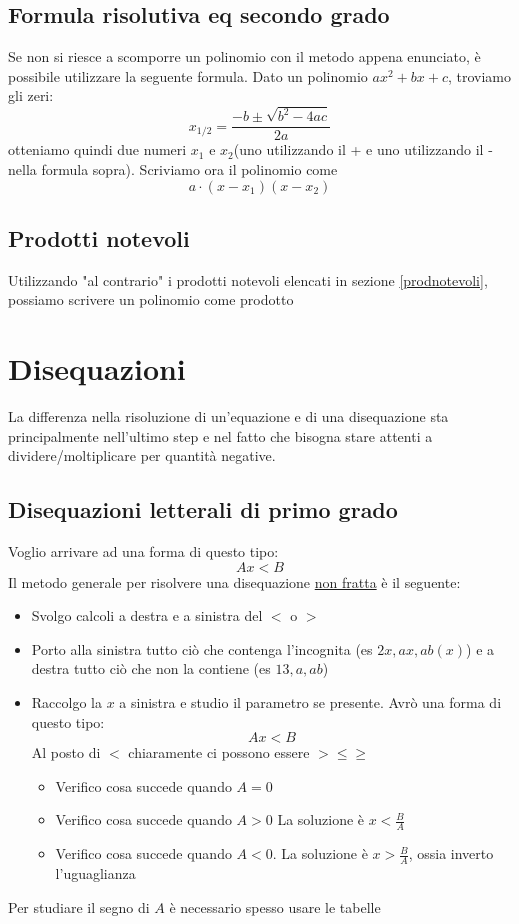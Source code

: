 \subsection{Formula risolutiva eq secondo grado}
Se non si riesce a scomporre un polinomio con il metodo appena enunciato, è possibile utilizzare la seguente formula. Dato un polinomio $ ax^2  + bx + c $, troviamo gli zeri:
\[
	x_{1 / 2} = \frac{-b \pm \sqrt{b^2 - 4ac}}{2a}
\]
otteniamo quindi due numeri $ x_1 $ e $ x_2 $(uno utilizzando il + e uno utilizzando il - nella formula sopra). Scriviamo ora il polinomio come
\[
	a\cdot \left(x-x_1\right)\left(x-x_2\right)
\]

\subsection{Prodotti notevoli}
Utilizzando "al contrario" i prodotti notevoli elencati in sezione \ref{prodnotevoli}, possiamo scrivere un polinomio come prodotto
\section{Disequazioni}
La differenza nella risoluzione di un'equazione e di una disequazione sta principalmente nell'ultimo step e nel fatto che bisogna stare attenti a dividere/moltiplicare per quantità negative.

\subsection{Disequazioni letterali di primo grado}
Voglio arrivare ad una forma di questo tipo:
\[
	Ax < B
\]
Il metodo generale per risolvere una disequazione \underline{non fratta} è il seguente:
\begin{itemize}
	\item Svolgo calcoli a destra e a sinistra del $ < $ o $ > $
	\item Porto alla sinistra tutto ciò che contenga l'incognita (es $ 2x, ax, ab\left(x\right) $) e a destra tutto ciò che non la contiene (es $ 13, a, ab $)
	\item Raccolgo la $ x $ a sinistra e studio il parametro se presente. Avrò una forma di questo tipo:
	      \[
		      Ax < B
	      \]
	      Al posto di $ < $ chiaramente ci possono essere $ > \le \ge  $
	      \begin{itemize}
		      \item Verifico cosa succede quando $ A = 0 $
		      \item Verifico cosa succede quando $ A>0 $ La soluzione è $ x < \frac{B}{A}  $
		      \item Verifico cosa succede quando $ A<0 $. La soluzione è $ x > \frac{B}{A}  $, ossia inverto l'uguaglianza
	      \end{itemize}
\end{itemize}
Per studiare il segno di $ A $ è necessario spesso usare le tabelle
